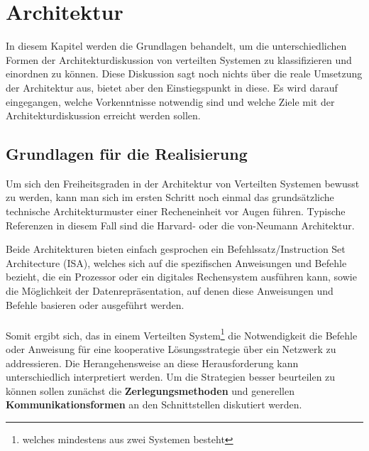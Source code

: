 \documentclass[../vs-script-first-v01.tex]{subfiles}
\begin{document}
\section{Architektur}
In diesem Kapitel werden die Grundlagen behandelt, um die unterschiedlichen Formen der Architekturdiskussion von verteilten Systemen zu klassifizieren und einordnen zu können. Diese Diskussion sagt noch nichts über die reale Umsetzung der Architektur aus, bietet aber den Einstiegspunkt in diese. Es wird darauf eingegangen, welche Vorkenntnisse notwendig sind und welche Ziele mit der Architekturdiskussion erreicht werden sollen. 
\subsection{Grundlagen für die Realisierung}

Um sich den Freiheitsgraden in der Architektur von Verteilten Systemen bewusst zu werden, kann man sich im ersten Schritt noch einmal das grundsätzliche technische Architekturmuster einer Recheneinheit vor Augen führen. Typische Referenzen in diesem Fall sind die Harvard- oder die von-Neumann Architektur. 

Beide Architekturen bieten einfach gesprochen ein Befehlssatz/Instruction Set Architecture (ISA), welches sich auf die spezifischen Anweisungen und Befehle bezieht, die ein Prozessor oder ein digitales Rechensystem ausführen kann, sowie die Möglichkeit der Datenrepräsentation, auf denen diese Anweisungen und Befehle basieren oder ausgeführt werden.
\\\\
Somit ergibt sich, das in einem Verteilten System\footnote{welches mindestens aus zwei Systemen besteht} die Notwendigkeit die Befehle oder Anweisung für eine kooperative Lösungsstrategie über ein Netzwerk zu addressieren. Die Herangehensweise an diese Herausforderung kann unterschiedlich interpretiert werden. Um die Strategien besser beurteilen zu können sollen zunächst die \textbf{Zerlegungsmethoden} und generellen \textbf{Kommunikationsformen} an den Schnittstellen diskutiert werden. 
\end{document}
